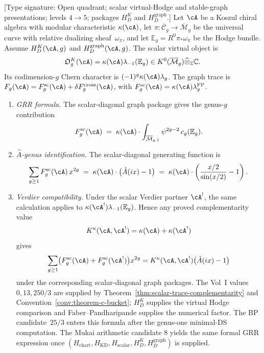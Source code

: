 \begin{theorem}\label{thm:guide-family-index}
\textup{[Type signature: Open quadrant; scalar virtual-Hodge and
stable-graph presentations; levels $4\to5$; packages
$H_D^K$ and $H_D^{\mathrm{graph}}$.]}
Let $\cA$ be a Koszul chiral algebra with modular characteristic
$\kappa(\cA)$, let $\pi \colon \overline{\mathcal{C}}_g \to
\overline{\mathcal{M}}_g$ be the universal curve with relative
dualizing sheaf~$\omega_\pi$, and let
$\mathbb{E}_g = R^0\pi_*\omega_\pi$ be the Hodge bundle.
Assume $H_D^K(\cA,g)$ and $H_D^{\mathrm{graph}}(\cA,g)$.  The scalar
virtual object is
\[
\mathfrak O_g^K(\cA)
=
\kappa(\cA)\lambda_{-1}(\mathbb E_g)
\in K^0(\overline{\mathcal M}_g)\widehat\otimes_{\mathbb Z}\mathbb C .
\]
Its codimension-$g$ Chern character is
$(-1)^g\kappa(\cA)\lambda_g$.  The graph trace is
$F_g(\cA)=F_g^{\mathrm{sc}}(\cA)+\delta F_g^{\mathrm{cross}}(\cA)$,
with $F_g^{\mathrm{sc}}(\cA)=\kappa(\cA)\lambda_g^{\mathrm{FP}}$.
\begin{enumerate}[label=\textup{(\roman*)}]
\item \emph{GRR formula.}
The scalar-diagonal graph package gives the genus-$g$ contribution
\[
F_g^{\mathrm{sc}}(\cA)
\;=\;
\kappa(\cA) \cdot
\int_{\overline{\mathcal{M}}_{g,1}} \psi^{2g-2}\, c_g(\mathbb{E}_g).
\]

\item \emph{$\hat{A}$-genus identification.}
The scalar-diagonal generating function is
\[
\sum_{g \geq 1} F_g^{\mathrm{sc}}(\cA)\, x^{2g}
\;=\;
\kappa(\cA) \cdot \bigl(\hat{A}(ix) - 1\bigr)
\;=\;
\kappa(\cA) \cdot
\left(\frac{x/2}{\sin(x/2)} - 1\right).
\]

\item \emph{Verdier compatibility.}
Under the scalar Verdier partner $\cA^!$, the same calculation
applies to $\kappa(\cA^!)\lambda_{-1}(\mathbb E_g)$. Hence any proved
complementarity value
\[
K^\kappa(\cA,\cA^!)=\kappa(\cA)+\kappa(\cA^!)
\]
gives
\[
\sum_{g\ge1}\bigl(F_g^{\mathrm{sc}}(\cA)
+F_g^{\mathrm{sc}}(\cA^!)\bigr)x^{2g}
=K^\kappa(\cA,\cA^!)\bigl(\hat{A}(ix)-1\bigr)
\]
under the corresponding scalar-diagonal graph packages. The Vol~I
values $0,13,250/3$ are supplied by
Theorem~\ref{thm:scalar-trace-complementarity} and
Convention~\ref{conv:theorem-c-bucket}; $H_D^K$ supplies the virtual
Hodge comparison and Faber--Pandharipande supplies the numerical
factor.  The BP candidate~$25/3$ enters this formula after the genus-one
minimal-DS computation.  The Mukai arithmetic candidate $8$ yields the
same formal GRR expression once
$(H_{\mathrm{chart}},H_{\mathrm{KD}},H_{\mathrm{scalar}},
H_D^K,H_D^{\mathrm{graph}})$ is supplied.
\end{enumerate}
\end{theorem}


